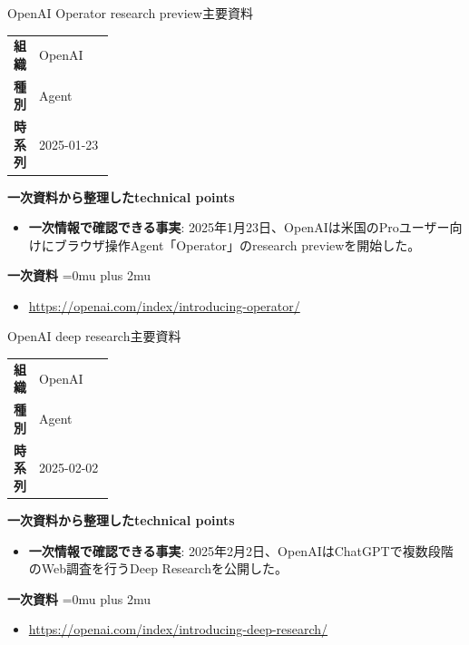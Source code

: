 \begin{technicalnote}{OpenAI Operator research preview}{主要資料}
\begingroup
\begin{tabularx}{\linewidth}{@{}>{\bfseries}p{0.22\linewidth}X@{}}
組織 & OpenAI \\
種別 & Agent \\
時系列 & 2025-01-23 \\
\end{tabularx}
\smallskip
\begin{minipage}{\linewidth}
{\bfseries 一次資料から整理したtechnical points}
\begin{itemize}[leftmargin=1.5em,itemsep=0.35em]
\item \textbf{一次情報で確認できる事実}: 2025年1月23日、OpenAIは米国のProユーザー向けにブラウザ操作Agent「Operator」のresearch previewを開始した。
\end{itemize}
\begin{samepage}
{\bfseries 一次資料}
\begingroup\sloppy
\Urlmuskip=0mu plus 2mu\relax
\begin{itemize}[leftmargin=1.5em,itemsep=0.25em]
\item {\scriptsize\url{https://openai.com/index/introducing-operator/}}
\end{itemize}
\endgroup
\end{samepage}
\end{minipage}
\endgroup
\end{technicalnote}
\medskip

\begin{technicalnote}{OpenAI deep research}{主要資料}
\begingroup
\begin{tabularx}{\linewidth}{@{}>{\bfseries}p{0.22\linewidth}X@{}}
組織 & OpenAI \\
種別 & Agent \\
時系列 & 2025-02-02 \\
\end{tabularx}
\smallskip
\begin{minipage}{\linewidth}
{\bfseries 一次資料から整理したtechnical points}
\begin{itemize}[leftmargin=1.5em,itemsep=0.35em]
\item \textbf{一次情報で確認できる事実}: 2025年2月2日、OpenAIはChatGPTで複数段階のWeb調査を行うDeep Researchを公開した。
\end{itemize}
\begin{samepage}
{\bfseries 一次資料}
\begingroup\sloppy
\Urlmuskip=0mu plus 2mu\relax
\begin{itemize}[leftmargin=1.5em,itemsep=0.25em]
\item {\scriptsize\url{https://openai.com/index/introducing-deep-research/}}
\end{itemize}
\endgroup
\end{samepage}
\end{minipage}
\endgroup
\end{technicalnote}
\medskip

